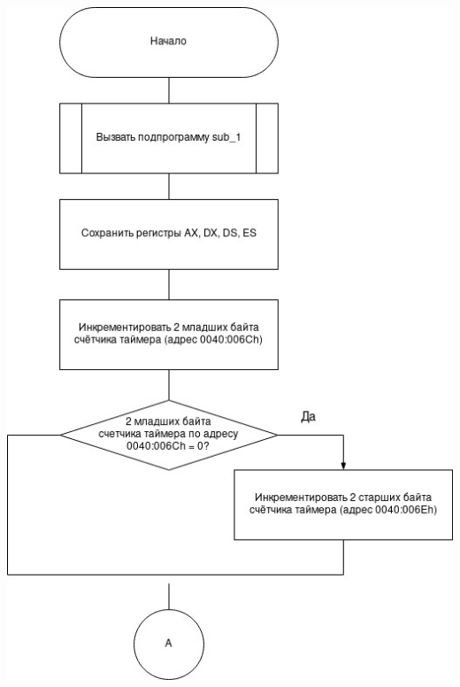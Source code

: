 \documentclass[a4paper,12pt]{article}
\begin{document}
\begin{flushright}
	\includegraphics[scale=0.76]{../src/int8h_1.jpg}

\end{flushright}
\end{document}
